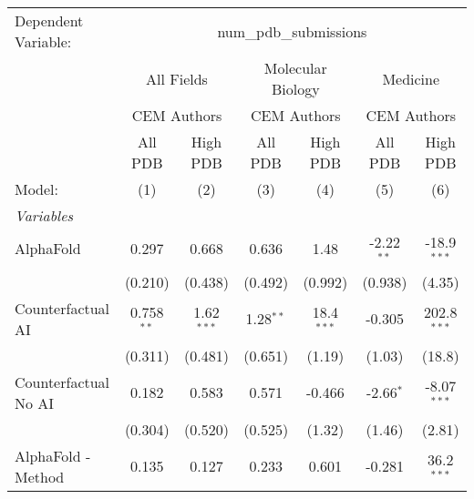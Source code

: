 \begingroup
\centering
\begin{tabular}{lcccccc}
   \tabularnewline \midrule \midrule
   Dependent Variable: & \multicolumn{6}{c}{num\_pdb\_submissions}\\
 & \multicolumn{2}{c}{All Fields} & \multicolumn{2}{c}{Molecular Biology} & \multicolumn{2}{c}{Medicine} \\
\cmidrule(lr){2-3} \cmidrule(lr){4-5} \cmidrule(lr){6-7}
 & \multicolumn{2}{c}{CEM Authors} & \multicolumn{2}{c}{CEM Authors} & \multicolumn{2}{c}{CEM Authors} \\
\cmidrule(lr){2-3} \cmidrule(lr){4-5} \cmidrule(lr){6-7}
 & \multicolumn{1}{c}{All PDB} & \multicolumn{1}{c}{High PDB} & \multicolumn{1}{c}{All PDB} & \multicolumn{1}{c}{High PDB} & \multicolumn{1}{c}{All PDB} & \multicolumn{1}{c}{High PDB} \\
\cmidrule(lr){2-2} \cmidrule(lr){3-3} \cmidrule(lr){4-4} \cmidrule(lr){5-5} \cmidrule(lr){6-6} \cmidrule(lr){7-7}
   Model:                                                     & (1)          & (2)           & (3)          & (4)           & (5)          & (6)\\  
   \midrule
   \emph{Variables}\\
   AlphaFold                                                  & 0.297        & 0.668         & 0.636        & 1.48          & -2.22$^{**}$ & -18.9$^{***}$\\   
                                                              & (0.210)      & (0.438)       & (0.492)      & (0.992)       & (0.938)      & (4.35)\\   
   Counterfactual AI                                          & 0.758$^{**}$ & 1.62$^{***}$  & 1.28$^{**}$  & 18.4$^{***}$  & -0.305       & 202.8$^{***}$\\   
                                                              & (0.311)      & (0.481)       & (0.651)      & (1.19)        & (1.03)       & (18.8)\\   
   Counterfactual No AI                                       & 0.182        & 0.583         & 0.571        & -0.466        & -2.66$^{*}$  & -8.07$^{***}$\\   
                                                              & (0.304)      & (0.520)       & (0.525)      & (1.32)        & (1.46)       & (2.81)\\   
   AlphaFold - Method                                         & 0.135        & 0.127         & 0.233        & 0.601         & -0.281       & 36.2$^{***}$\\   

\end{tabular}
